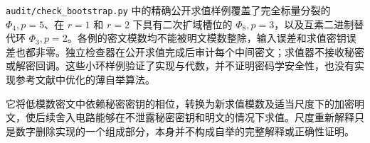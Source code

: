 \texttt{audit/check\_bootstrap.py} 中的精确公开求值样例覆盖了完全标量分裂的 $\Phi_4,p=5$、在 $r=1$ 和 $r=2$ 下具有二次扩域槽位的 $\Phi_8,p=3$，以及互素二进制替代环 $\Phi_3,p=2$。各例的密文模数均不能被明文模数整除，输入误差和求值密钥误差也都非零。独立检查器在公开求值完成后审计每个中间密文；求值器不接收秘密或解密回调。这些小环样例验证了实现与代数，并不证明密码学安全性，也没有实现参考文献中优化的薄自举算法。

它将低模数密文中依赖秘密密钥的相位，转换为新求值模数及适当尺度下的加密明文，使后续舍入电路能够在不泄露秘密密钥和明文的情况下求值。尺度重新解释只是数字删除实现的一个组成部分，本身并不构成自举的完整解释或正确性证明。

